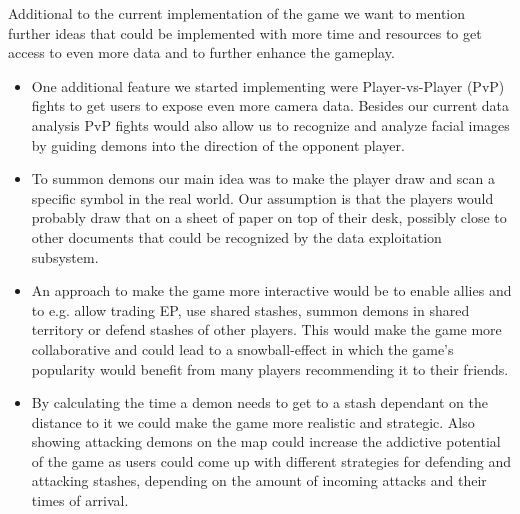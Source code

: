 Additional to the current implementation of the game we want to mention further ideas that could be implemented with more time and resources to get access to even more data and to further enhance the gameplay.

\begin{itemize}
    \item One additional feature we started implementing were Player-vs-Player (PvP) fights to get users to expose even more camera data.
    Besides our current data analysis PvP fights would also allow us to recognize and analyze facial images by guiding demons into the direction of the opponent player.
    \item To summon demons our main idea was to make the player draw and scan a specific symbol in the real world.
    Our assumption is that the players would probably draw that on a sheet of paper on top of their desk, possibly close to other documents that could be recognized by the data exploitation subsystem.
    \item An approach to make the game more interactive would be to enable allies and to e.g. allow trading EP, use shared stashes, summon demons in shared territory or defend stashes of other players.
    This would make the game more collaborative and could lead to a snowball-effect in which the game's popularity would benefit from many players recommending it to their friends.
    \item By calculating the time a demon needs to get to a stash dependant on the distance to it we could make the game more realistic and strategic. 
    Also showing attacking demons on the map could increase the addictive potential of the game as users could come up with different strategies for defending and attacking stashes, depending on the amount of incoming attacks and their times of arrival.
\end{itemize}






